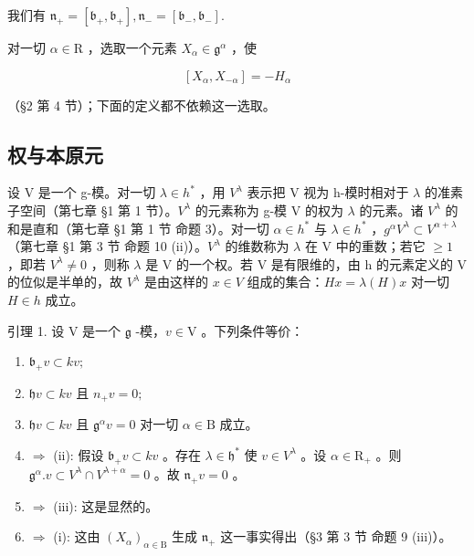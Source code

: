 我们有 \(\mathfrak{n}_{+} = [\mathfrak{b}_{+},\mathfrak{b}_{+}],\mathfrak{n}_{-} = [\mathfrak{b}_{-},\mathfrak{b}_{-}].\)

对一切 \(\alpha\in\mathrm{R}\) ，选取一个元素 \(X_{\alpha}\in\mathfrak{g}^{\alpha}\) ，使

\[
[ X _ {\alpha}, X _ {- \alpha} ] = - H _ {\alpha}
\]

（§2 第 4 节）；下面的定义都不依赖这一选取。

\subsection{权与本原元}

设 V 是一个 g-模。对一切 \(\lambda\in h^{*}\) ，用 \(V^{\lambda}\) 表示把 V 视为 h-模时相对于 \(\lambda\) 的准素子空间（第七章 §1 第 1 节）。\(V^{\lambda}\) 的元素称为 g-模 V 的权为 \(\lambda\) 的元素。诸 \(V^{\lambda}\) 的和是直和（第七章 §1 第 1 节 命题 3）。对一切 \(\alpha\in h^{*}\) 与 \(\lambda\in h^{*}\) ，\(g^{\alpha}V^{\lambda}\subset V^{\alpha+\lambda}\) （第七章 §1 第 3 节 命题 10 (ii)）。\(V^{\lambda}\) 的维数称为 \(\lambda\) 在 V 中的重数；若它 \(\geq1\) ，即若 \(V^{\lambda}\neq0\) ，则称 \(\lambda\) 是 V 的一个权。若 V 是有限维的，由 h 的元素定义的 V 的位似是半单的，故 \(V^{\lambda}\) 是由这样的 \(x\in V\) 组成的集合：\(Hx=\lambda(H)x\) 对一切 \(H\in h\) 成立。

引理 1. 设 \(\mathrm{V}\) 是一个 \(\mathfrak{g}\) -模，\(v \in \mathrm{V}\) 。下列条件等价：

\begin{enumerate}
\def\labelenumi{(\roman{enumi})}
\item
  \(\mathfrak{b}_{+}v\subset kv;\)
\item
  \(\mathfrak{h}v \subset kv\) 且 \(n_{+}v = 0;\)
\item
  \(\mathfrak{h}v\subset kv\) 且 \(\mathfrak{g}^{\alpha}v = 0\) 对一切 \(\alpha \in \mathrm{B}\) 成立。
\item
  \(\Longrightarrow\) (ii): 假设 \(\mathfrak{b}_{+}v\subset kv\) 。存在 \(\lambda \in \mathfrak{h}^*\) 使 \(v\in V^{\lambda}\) 。设 \(\alpha \in \mathrm{R}_{+}\) 。则 \(\mathfrak{g}^{\alpha}.v\subset V^{\lambda}\cap V^{\lambda +\alpha} = 0\) 。故 \(\mathfrak{n}_{+}v = 0\) 。
\item
  \(\Longrightarrow\) (iii): 这是显然的。
\item
  \(\Longrightarrow\) (i): 这由 \((X_{\alpha})_{\alpha \in \mathrm{B}}\) 生成 \(\mathfrak{n}_{+}\) 这一事实得出（§3 第 3 节 命题 9 (iii)）。
\end{enumerate}

